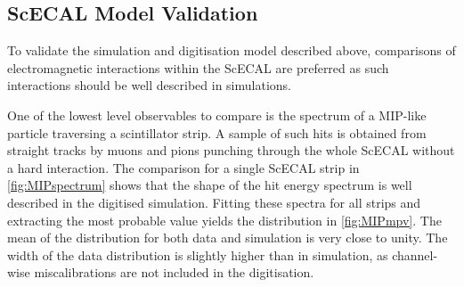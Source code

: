 \documentclass[twoside,a4paper,12pt]{article}
\newcommand\piminus{\(\mathrm{\pi^-}\)}
\newcommand\geant{\textsc{Geant\,4}\xspace}
\begin{document}
\subsection{ScECAL Model Validation}\label{sec:scecalvalidation}
To validate the simulation and digitisation model described above, comparisons of electromagnetic interactions within the ScECAL are preferred as such interactions should be well described in simulations. 

One of the lowest level observables to compare is the spectrum of a MIP-like particle traversing a scintillator strip. A sample of such hits is obtained from straight tracks by muons and pions punching through the whole ScECAL without a hard interaction. The comparison for a single ScECAL strip in \autoref{fig:MIPspectrum} shows that the shape of the hit energy spectrum is well described in the digitised simulation. Fitting these spectra for all strips and extracting the most probable value yields the distribution in \autoref{fig:MIPmpv}. The mean of the distribution for both data and simulation is very close to unity. The width of the data distribution is slightly higher than in simulation, as channel-wise miscalibrations are not included in the digitisation.
\end{document}
